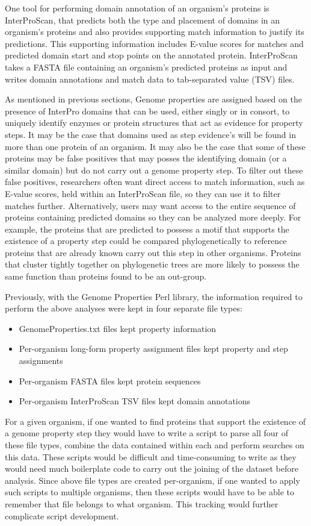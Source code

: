 One tool for performing domain annotation of an organism's proteins is InterProScan, that predicts both the type and placement of domains in an organism's proteins and also provides supporting match information to justify its predictions. This supporting information includes E-value scores for matches and predicted domain start and stop points on the annotated protein. InterProScan takes a FASTA file \cite{pearson19905} containing an organism's predicted proteins as input and writes domain annotations and match data to tab-separated value (TSV) files.

As mentioned in previous sections, Genome properties are assigned based on the presence of InterPro domains that can be used, either singly or in consort, to uniquely identify enzymes or protein structures that act as evidence for property steps. It may be the case that domains used as step evidence's will be found in more than one protein of an organism. It may also be the case that some of these proteins may be false positives that may posses the identifying domain (or a similar domain) but do not carry out a genome property step. To filter out these false positives, researchers often want direct access to match information, such as E-value scores, held within an InterProScan file, so they can use it to filter matches further. Alternatively, users may want access to the entire sequence of proteins containing predicted domains so they can be analyzed more deeply. For example, the proteins that are predicted to possess a motif that supports the existence of a property step could be compared phylogenetically to reference proteins that are already known carry out this step in other organisms. Proteins that cluster tightly together on phylogenetic trees are more likely to possess the same function than proteins found to be an out-group.

Previously, with the Genome Properties Perl library, the information required to perform the above analyses were kept in four separate file types: 
\begin{itemize}
\item GenomeProperties.txt files kept property information
\item Per-organism long-form property assignment files kept property and step assignments
\item Per-organism FASTA files \cite{pearson19905} kept protein sequences 
\item  Per-organism InterProScan TSV files kept domain annotations 
\end{itemize}
For a given organism, if one wanted to find proteins that support the existence of a genome property step they would have to write a script to parse all four of these file types, combine the data contained within each and perform searches on this data. These scripts would be difficult and time-consuming to write as they would need much boilerplate code to carry out the joining of the dataset before analysis. Since above file types are created per-organism, if one wanted to apply such scripts to multiple organisms, then these scripts would have to be able to remember that file belongs to what organism. This tracking would further complicate script development.

